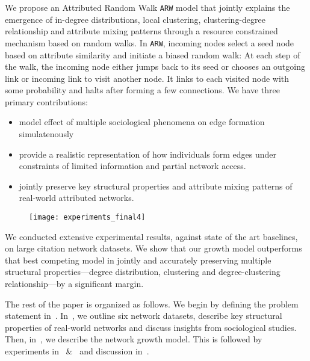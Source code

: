 

We propose an Attributed Random Walk \texttt{ARW} model that jointly explains
the emergence of in-degree distributions, local clustering, clustering-degree
relationship and attribute mixing patterns through a resource constrained mechanism
based on random walks.
In \texttt{ARW}, incoming nodes select a seed node based on attribute similarity
and initiate a biased random walk: At each step of the walk, the incoming node either
jumps back to its seed or chooses an outgoing link or incoming link to visit another
node. It links to each visited node with some probability and halts after forming a
few connections. We have three primary contributions:
\begin{itemize}
\item model effect of multiple sociological phenomena on edge formation simulatenously
\item provide a realistic representation of how individuals form edges under constraints of limited information and partial network access.
\item jointly preserve key structural properties and attribute mixing patterns of real-world attributed networks.
\end{itemize}

\begin{figure}[t]
 \centering
 \texttt{[image: experiments\_final4]}
 \caption{
 }
 \label{fig:intro_plot}
\end{figure}

We conducted extensive experimental results, against state of the art
baselines, on large citation network datasets. We show that our growth model
outperforms that best competing model in jointly and accurately preserving
multiple structural properties---degree distribution, clustering and
degree-clustering relationship---by a significant margin.

The rest of the paper is organized as follows.
We begin by defining the problem statement in~.
In~, we outline six network datasets, describe key structural
properties of real-world networks and discuss insights from sociological studies.
Then, in~, we describe the network growth model. This
is followed by experiments in~ \&~
and discussion in~.

